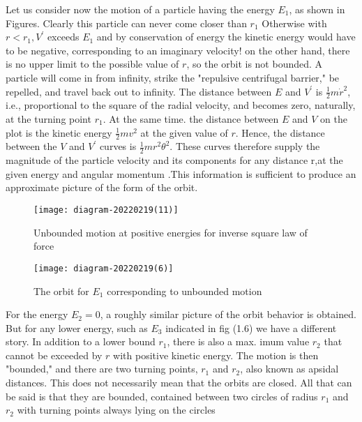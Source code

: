 Let us consider now the motion of a particle having the energy $E_{1}$, as shown in Figures. Clearly this particle can never come closer than $r_{1}$  Otherwise with $r<r_{1}, V^{\prime}$ exceeds $E_{1}$ and by conservation of energy the kinetic energy would have to be negative, corresponding to an imaginary velocity! on the other hand, there is no upper limit to the possible value of $r$, so the orbit is not bounded. A particle will come in from infinity, strike the "repulsive centrifugal barrier," be repelled, and travel back out to infinity. The distance between $E$ and $V^{\prime}$ is $\frac{1}{2} m \dot{r}^{2}$, i.e., proportional to the square of the radial velocity, and becomes zero, naturally, at the turning point $r_{1}$. At the same time. the distance between $E$ and $V$ on the plot is the kinetic energy $\frac{1}{2} m v^{2}$ at the given value of $r$. Hence, the distance between the $V$ and $V^{\prime}$ curves is $\frac{1}{2} m r^{2} \theta^{2}$. These curves therefore supply the magnitude of the particle velocity and its components for any distance r,at the given energy and angular momentum .This information is sufficient to produce an approximate picture of the form of the orbit.\\
\begin{minipage}{0.5\textwidth}
\begin{figure}[H]
	\centering
	\texttt{[image: diagram-20220219(11)]}
	\caption{Unbounded motion at positive energies for inverse square law of force}
	\label{}
\end{figure}
\end{minipage}
\begin{minipage}{0.5\textwidth}
\begin{figure}[H]
	\centering
	\texttt{[image: diagram-20220219(6)]}
	\caption{The orbit for $E_1$ corresponding to unbounded motion}
	\label{}
\end{figure}
\end{minipage}
\par For the energy $E_{2}=0$, a roughly similar picture of the orbit behavior is obtained. But for any lower energy, such as $E_{3}$ indicated in fig (1.6) we have a different story. In addition to a lower bound $r_{1}$, there is also a max. imum value $r_{2}$ that cannot be exceeded by $r$ with positive kinetic energy. The motion is then "bounded," and there are two turning points, $r_{1}$ and $r_{2}$, also known as apsidal distances. This does not necessarily mean that the orbits are closed. All that can be said is that they are bounded, contained between two circles of radius $r_{1}$ and $r_{2}$ with turning points always lying on the circles\\
